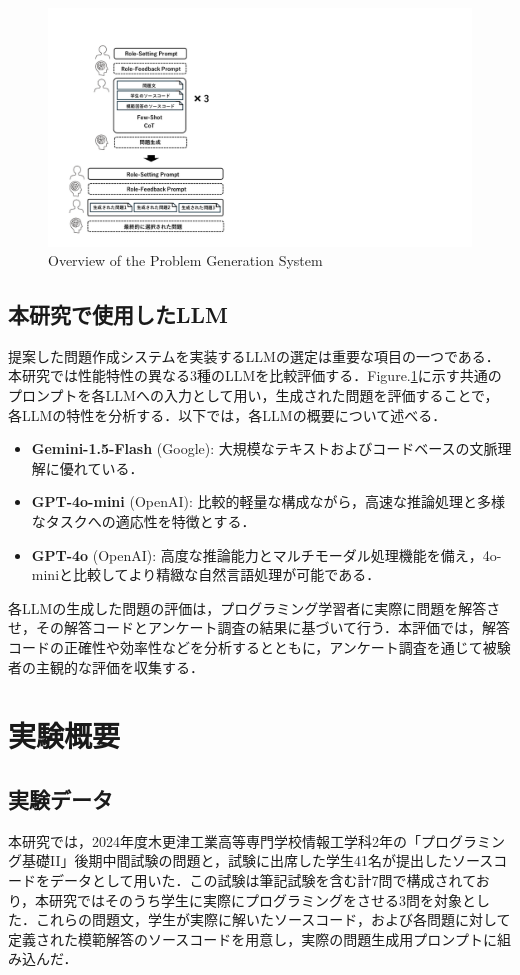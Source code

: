 \documentclass[twocolumn, fleqn, uplatex]{jsarticle}
\begin{document}
\begin{figure}
    \centering
    \includegraphics[width=1.0\linewidth]{figure/archtecture_figure_short_tlim.pdf}
    \caption{Overview of the Problem Generation System}
    \label{fig:system_overview}
\end{figure}

\subsection{本研究で使用したLLM}
提案した問題作成システムを実装するLLMの選定は重要な項目の一つである．本研究では性能特性の異なる3種のLLMを比較評価する．Figure.\ref{fig:system_overview}に示す共通のプロンプトを各LLMへの入力として用い，生成された問題を評価することで，各LLMの特性を分析する．以下では，各LLMの概要について述べる．
\begin{itemize}
\item \textbf{Gemini-1.5-Flash} (Google): 大規模なテキストおよびコードベースの文脈理解に優れている．
\item \textbf{GPT-4o-mini} (OpenAI): 比較的軽量な構成ながら，高速な推論処理と多様なタスクへの適応性を特徴とする．
\item \textbf{GPT-4o} (OpenAI): 高度な推論能力とマルチモーダル処理機能を備え，4o-miniと比較してより精緻な自然言語処理が可能である．
\end{itemize}
各LLMの生成した問題の評価は，プログラミング学習者に実際に問題を解答させ，その解答コードとアンケート調査の結果に基づいて行う．本評価では，解答コードの正確性や効率性などを分析するとともに，アンケート調査を通じて被験者の主観的な評価を収集する．


\section{実験概要}
\subsection{実験データ}
本研究では，2024年度木更津工業高等専門学校情報工学科2年の「プログラミング基礎II」後期中間試験の問題と，試験に出席した学生41名が提出したソースコードをデータとして用いた．この試験は筆記試験を含む計7問で構成されており，本研究ではそのうち学生に実際にプログラミングをさせる3問を対象とした．これらの問題文，学生が実際に解いたソースコード，および各問題に対して定義された模範解答のソースコードを用意し，実際の問題生成用プロンプトに組み込んだ．
\end{document}
